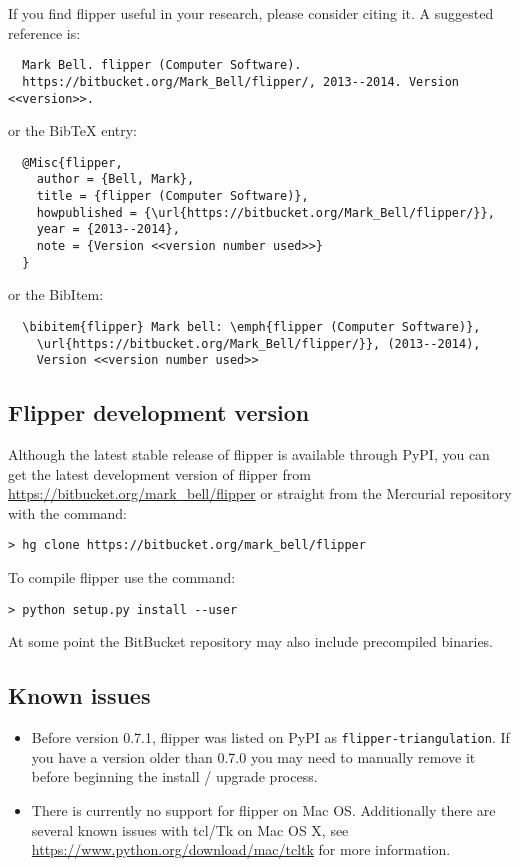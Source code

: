 \documentclass[a4paper]{article}
\begin{document}
If you find flipper useful in your research, please consider citing it. A suggested reference is:
\begin{verbatim}
  Mark Bell. flipper (Computer Software).
  https://bitbucket.org/Mark_Bell/flipper/, 2013--2014. Version <<version>>.
\end{verbatim}
or the BibTeX entry:
\begin{verbatim}
  @Misc{flipper,
    author = {Bell, Mark},
    title = {flipper (Computer Software)},
    howpublished = {\url{https://bitbucket.org/Mark_Bell/flipper/}},
    year = {2013--2014},
    note = {Version <<version number used>>}
  }
\end{verbatim}
or the BibItem:
\begin{verbatim}
  \bibitem{flipper} Mark bell: \emph{flipper (Computer Software)},
    \url{https://bitbucket.org/Mark_Bell/flipper/}}, (2013--2014),
    Version <<version number used>>
\end{verbatim}

\subsection{Flipper development version}
Although the latest stable release of flipper is available through PyPI, you can get the latest development version of flipper from \url{https://bitbucket.org/mark_bell/flipper} or straight from the Mercurial \cite{mercurial} repository with the command:
\begin{lstlisting}
> hg clone https://bitbucket.org/mark_bell/flipper
\end{lstlisting}
To compile flipper use the command:
\begin{lstlisting}
> python setup.py install --user
\end{lstlisting}

At some point the BitBucket repository may also include precompiled binaries.

\subsection{Known issues}

\begin{itemize}
\item Before version 0.7.1, flipper was listed on PyPI as \texttt{flipper-triangulation}. If you have a version older than 0.7.0 you may need to manually remove it before beginning the install / upgrade process.
\item There is currently no support for flipper on Mac OS. Additionally there are several known issues with tcl/Tk on Mac OS X, see \url{https://www.python.org/download/mac/tcltk} for more information.
\end{itemize}
\end{document}
